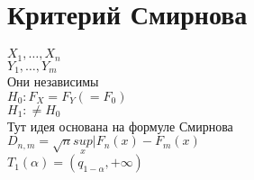 \documentclass{article}
\newcommand\0{\mathbb{0}}
\newcommand\1{\mathbb{1}}
\begin{document}
\section{Критерий Смирнова}
$X_1, \dots, X_n$\\
$Y_1, \dots, Y_m$\\
Они независимы\\
$H_0: F_X = F_Y (= F_0)$\\
$H_1: \neq H_0$\\
Тут идея основана на формуле Смирнова\\
$D_{n, m} = \sqrt{n}\underset{x}{sup}|F_n(x) - F_m(x)$\\
$T_1(\alpha) = (q_{1 - \alpha}, +\infty)$
\end{document}
